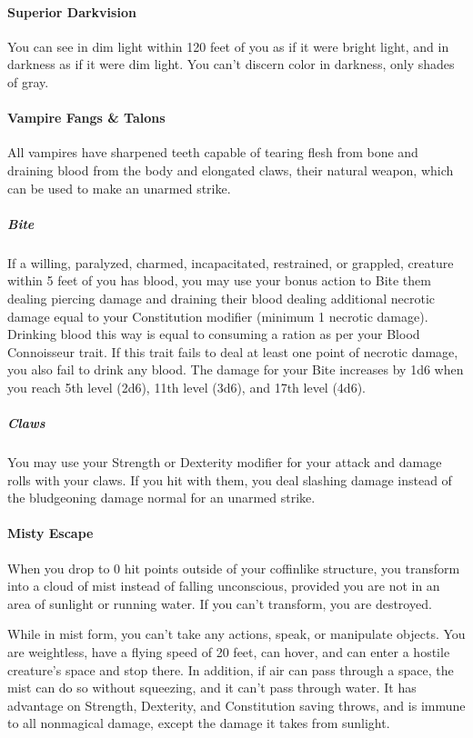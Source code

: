 \documentclass[letterpaper,openany,oneside,twocolumn]{book}
\begin{document}
\paragraph*{Superior Darkvision}
You can see in dim light within 120 feet of you as if it were bright light, and in darkness as if it were dim light. You can't discern color in darkness, only shades of gray.
\paragraph*{Vampire Fangs \& Talons}
All vampires have sharpened teeth capable of tearing flesh from bone and draining blood from the body and elongated claws, their natural weapon, which can be used to make an unarmed strike.
\subparagraph*{Bite}
If a willing, paralyzed, charmed, incapacitated, restrained, or grappled, creature within 5 feet of you has blood, you may use your bonus action to Bite them dealing  piercing damage and draining their blood dealing additional necrotic damage equal to your Constitution modifier (minimum 1 necrotic damage). Drinking blood this way is equal to consuming a ration as per your Blood Connoisseur trait. If this trait fails to deal at least one point of necrotic damage, you also fail to drink any blood. The damage for your Bite increases by 1d6 when you reach 5th level (2d6), 11th level (3d6), and 17th level (4d6).
\subparagraph*{Claws}
You may use your Strength or Dexterity modifier for your attack and damage rolls with your claws. If you hit with them, you deal  slashing damage instead of the bludgeoning damage normal for an unarmed strike.\\
\paragraph*{Misty Escape}
When you drop to 0 hit points outside of your coffinlike structure, you transform into a cloud of mist instead of falling unconscious, provided you are not in an area of sunlight or running water. If you can't transform, you are destroyed.

While in mist form, you can't take any actions, speak, or manipulate objects. You are weightless, have a flying speed of 20 feet, can hover, and can enter a hostile creature's space and stop there. In addition, if air can pass through a space, the mist can do so without squeezing, and it can't pass through water. It has advantage on Strength, Dexterity, and Constitution saving throws, and is immune to all nonmagical damage, except the damage it takes from sunlight.
\end{document}
